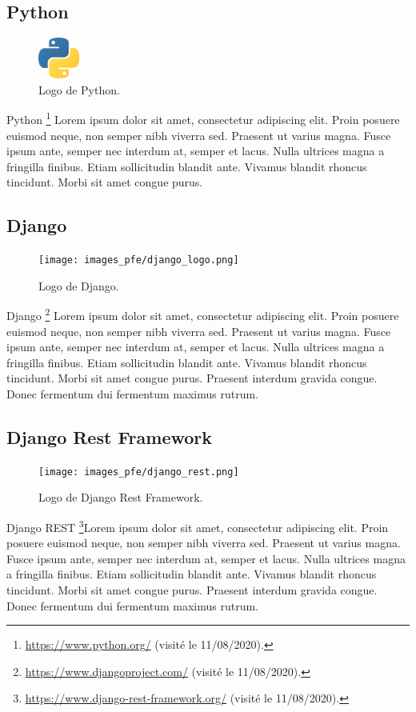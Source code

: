 \subsection*{Python}

\begin{figure}
  \centering
  \includegraphics[width=0.12\textwidth]{images_pfe/python_logo.png}
  \caption{Logo de Python.}
\end{figure}
\FloatBarrier
Python \footnote{\url{https://www.python.org/} (visité le 11/08/2020).} Lorem ipsum dolor sit amet, consectetur adipiscing elit. Proin posuere euismod neque, non semper nibh viverra sed. Praesent ut varius magna. Fusce ipsum ante, semper nec interdum at, semper et lacus. Nulla ultrices magna a fringilla finibus. Etiam sollicitudin blandit ante. Vivamus blandit rhoncus tincidunt. Morbi sit amet congue purus.

\vspace{.5cm}

\subsection*{Django}

\begin{figure}
  \centering
  \texttt{[image: images\_pfe/django\_logo.png]}
  \caption{Logo de Django.}
\end{figure}
\FloatBarrier
Django \footnote{\url{https://www.djangoproject.com/} (visité le 11/08/2020).} Lorem ipsum dolor sit amet, consectetur adipiscing elit. Proin posuere euismod neque, non semper nibh viverra sed. Praesent ut varius magna. Fusce ipsum ante, semper nec interdum at, semper et lacus. Nulla ultrices magna a fringilla finibus. Etiam sollicitudin blandit ante. Vivamus blandit rhoncus tincidunt. Morbi sit amet congue purus. Praesent interdum gravida congue. Donec fermentum dui fermentum maximus rutrum.

\vspace{.5cm}

\subsection*{Django Rest Framework}

\begin{figure}
  \centering
  \texttt{[image: images\_pfe/django\_rest.png]}
  \caption{Logo de Django Rest Framework.}
\end{figure}
\FloatBarrier
Django REST \footnote{\url{https://www.django-rest-framework.org/} (visité le 11/08/2020).}Lorem ipsum dolor sit amet, consectetur adipiscing elit. Proin posuere euismod neque, non semper nibh viverra sed. Praesent ut varius magna. Fusce ipsum ante, semper nec interdum at, semper et lacus. Nulla ultrices magna a fringilla finibus. Etiam sollicitudin blandit ante. Vivamus blandit rhoncus tincidunt. Morbi sit amet congue purus. Praesent interdum gravida congue. Donec fermentum dui fermentum maximus rutrum.

